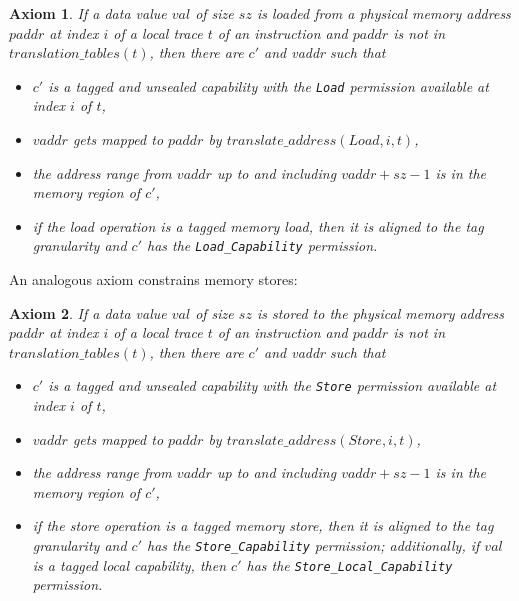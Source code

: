\documentclass[11pt]{article}
\newtheorem{axiom}{Axiom}
\theoremstyle{definition}
\begin{document}
\begin{axiom}
  \label{ax:load-data}
  If a data value $\mathit{val}$ of size $\mathit{sz}$ is loaded from a
  physical memory address $\mathit{paddr}$ at index $i$ of a local trace $t$
  of an instruction and $\mathit{paddr}$ is not in
  $\mathit{translation\_tables}(t)$, then there are $c'$ and vaddr such that
  \begin{itemize}
  \item $c'$ is a tagged and unsealed capability with the \verb|Load| permission available at index $i$ of $t$,
  \item $\mathit{vaddr}$ gets mapped to $\mathit{paddr}$ by $\mathit{translate\_address}(Load, i, t)$,
  \item the address range from $\mathit{vaddr}$ up to and including $\mathit{vaddr}+\mathit{sz}-1$ is in the memory region of $c'$,
  \item if the load operation is a tagged memory load,
  then it is aligned to the tag granularity and
  $c'$ has the \verb|Load_Capability| permission.
  \end{itemize}
\end{axiom}

An analogous axiom constrains memory stores:

\begin{axiom}
  If a data value $\mathit{val}$ of size $\mathit{sz}$ is stored to the
  physical memory address $\mathit{paddr}$ at index $i$ of a local trace $t$
  of an instruction and $\mathit{paddr}$ is not in
  $\mathit{translation\_tables}(t)$, then there are $c'$ and vaddr such that
  \begin{itemize}
  \item $c'$ is a tagged and unsealed capability with the \verb|Store| permission available at index $i$ of $t$,
  \item $\mathit{vaddr}$ gets mapped to $\mathit{paddr}$ by $\mathit{translate\_address}(Store, i, t)$,
  \item the address range from $\mathit{vaddr}$ up to and including $\mathit{vaddr}+\mathit{sz}-1$ is in the memory region of $c'$,
  \item if the store operation is a tagged memory store, then
  it is aligned to the tag granularity and
  $c'$ has the \verb|Store_Capability| permission;
  additionally, if $val$ is a tagged local capability, then $c'$ has the
  \verb|Store_Local_Capability| permission.
 \end{itemize}
\end{axiom}
\end{document}
